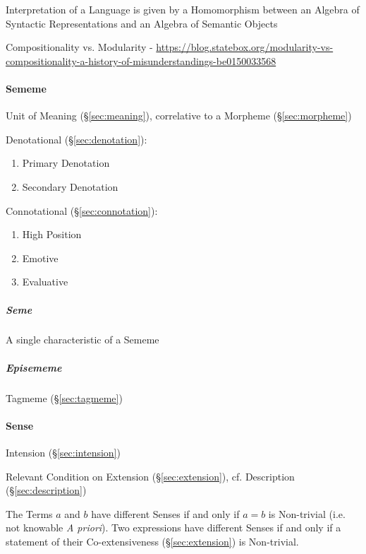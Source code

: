 Interpretation of a Language is given by a Homomorphism between an
Algebra of Syntactic Representations and an Algebra of Semantic
Objects

Compositionality vs. Modularity -
\url{https://blog.statebox.org/modularity-vs-compositionality-a-history-of-misunderstandings-be0150033568}



\paragraph{Sememe}\label{sec:sememe}\hfill

Unit of Meaning (\S\ref{sec:meaning}), correlative to a Morpheme
(\S\ref{sec:morpheme})

Denotational (\S\ref{sec:denotation}):

\begin{enumerate}
  \item Primary Denotation
  \item Secondary Denotation
\end{enumerate}

Connotational (\S\ref{sec:connotation}):

\begin{enumerate}
  \item High Position
  \item Emotive
  \item Evaluative
\end{enumerate}



\subparagraph{Seme}\label{sec:seme}\hfill

A single characteristic of a Sememe



\subparagraph{Episememe}\label{sec:episememe}\hfill

Tagmeme (\S\ref{sec:tagmeme})



\paragraph{Sense}\label{sec:sense}\hfill
\cite{chalmers02}

Intension (\S\ref{sec:intension})

Relevant Condition on Extension (\S\ref{sec:extension}), cf.
Description (\S\ref{sec:description})

The Terms $a$ and $b$ have different Senses if and only if $a = b$ is
Non-trivial (i.e. not knowable \emph{A priori}). Two expressions have
different Senses if and only if a statement of their Co-extensiveness
(\S\ref{sec:extension}) is Non-trivial.

